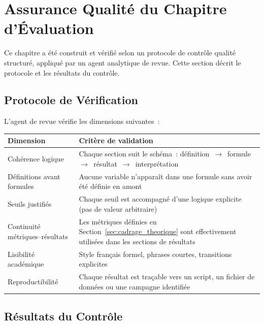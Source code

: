 \section{Assurance Qualité du Chapitre d'Évaluation}
\label{sec:controle_qualite_chapitre}

Ce chapitre a été construit et vérifié selon un protocole de contrôle qualité structuré, appliqué par un agent analytique de revue. Cette section décrit le protocole et les résultats du contrôle.

\subsection{Protocole de Vérification}

L'agent de revue vérifie les dimensions suivantes~:

\begin{longtable}{p{4cm}p{9cm}}
\toprule
\textbf{Dimension} & \textbf{Critère de validation} \\
\midrule
Cohérence logique & Chaque section suit le schéma~: définition~$\to$~formule~$\to$~résultat~$\to$~interprétation \\
Définitions avant formules & Aucune variable n'apparaît dans une formule sans avoir été définie en amont \\
Seuils justifiés & Chaque seuil est accompagné d'une logique explicite (pas de valeur arbitraire) \\
Continuité métriques--résultats & Les métriques définies en Section~\ref{sec:cadrage_theorique} sont effectivement utilisées dans les sections de résultats \\
Lisibilité académique & Style français formel, phrases courtes, transitions explicites \\
Reproductibilité & Chaque résultat est traçable vers un script, un fichier de données ou une campagne identifiée \\
\bottomrule
\end{longtable}

\subsection{Résultats du Contrôle}

